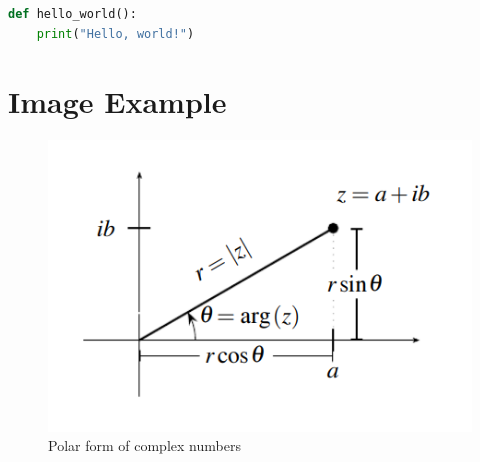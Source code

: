 \documentclass{article}
\theoremstyle{problemstyle}
\begin{document}
\begin{lstlisting}[language=Python, caption={Example Code Block}]
def hello_world():
    print("Hello, world!")
\end{lstlisting}

\section{Image Example}

\begin{figure}[H]
    \centering
    \includegraphics{../!assets/MATH1021-003-fig1.png}
    \caption{Polar form of complex numbers}
\end{figure}
\end{document}
